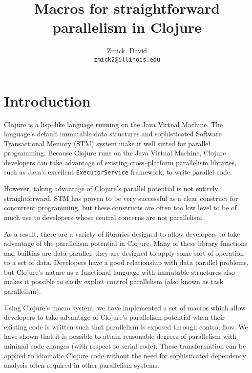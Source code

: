 \documentclass{sig-alternate}
\author{
    Zmick, David\\
    \texttt{zmick2@illinois.edu}
}
\title{Macros for straightforward parallelism in Clojure}
\def\code#1{\mbox{\texttt{#1}}}
\begin{document}
\maketitle

\section{Introduction}
Clojure is a lisp--like language running on the Java Virtual Machine.
The language's default immutable data structures and sophisticated Software Transactional Memory (STM) system make it well suited for parallel programming.
Because Clojure runs on the Java Virtual Machine, Clojure developers can take advantage of existing cross--platform parallelism libraries, such as Java's excellent \code{ExecutorService} framework, to write parallel code.

However, taking advantage of Clojure's parallel potential is not entirely straightforward.
STM has proven to be very successful as a clear construct for concurrent programming\cite{Jones2007a}, but these constructs are often too low level to be of much use to developers whose central concerns are not parallelism\cite{Boehm2009}.

As a result, there are a variety of libraries designed to allow developers to take advantage of the parallelism potential in Clojure.\footnotemark{}\footnotemark{}\footnotemark{}\footnotemark{}\footnotemark{}
Many of these library functions and builtins are data-parallel; they are designed to apply some sort of operation to a set of data.
Developers have a good relationship with data parallel problems\cite{Okur2012a}, but Clojure's nature as a functional language with immutable structures also makes it possible to easily exploit control parallelism (also known as task parallelism\cite{Andradea, Rodr}).


Using Clojure's macro system, we have implemented a set of macros which allow developers to take advantage of Clojure's parallelism potential when their existing code is written such that parallelism is exposed through control flow.
We have shown that it is possible to attain reasonable degrees of parallelism with minimal code changes (with respect to serial code).
These transformation can be applied to idiomatic Clojure code without the need for sophisticated dependency analysis often required in other parallelism systems.
\end{document}

